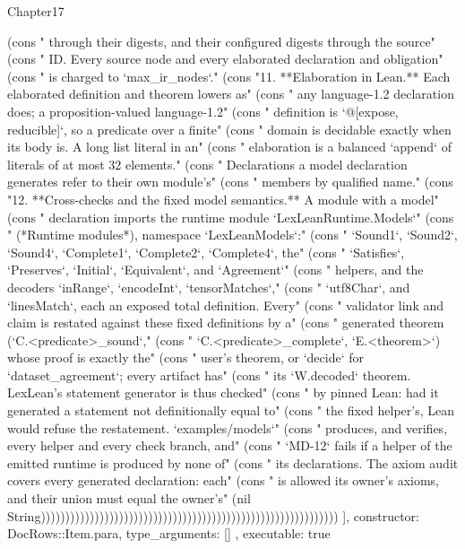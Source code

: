 \begin{lexlean}{Chapter17}
\begin{semanticmodule}
{{(cons "    through their digests, and their configured digests through the source" (cons "    ID. Every source node and every elaborated declaration and obligation" (cons "    is charged to `max_ir_nodes`." (cons "11. **Elaboration in Lean.** Each elaborated definition and theorem lowers as" (cons "    any language-1.2 declaration does; a proposition-valued language-1.2" (cons "    definition is `@[expose, reducible]`, so a predicate over a finite" (cons "    domain is decidable exactly when its body is. A long list literal in an" (cons "    elaboration is a balanced `append` of literals of at most 32 elements." (cons "    Declarations a model declaration generates refer to their own module's" (cons "    members by qualified name." (cons "12. **Cross-checks and the fixed model semantics.** A module with a model" (cons "    declaration imports the runtime module `LexLeanRuntime.Models`" (cons "    (*Runtime modules*), namespace `LexLeanModels`:" (cons "    `Sound1`, `Sound2`, `Sound4`, `Complete1`, `Complete2`, `Complete4`, the" (cons "    `Satisfies`, `Preserves`, `Initial`, `Equivalent`, and `Agreement`" (cons "    helpers, and the decoders `inRange`, `encodeInt`, `tensorMatches`," (cons "    `utf8Char`, and `linesMatch`, each an exposed total definition. Every" (cons "    validator link and claim is restated against these fixed definitions by a" (cons "    generated theorem (`C.<predicate>_sound`," (cons "    `C.<predicate>_complete`, `E.<theorem>`) whose proof is exactly the" (cons "    user's theorem, or `decide` for `dataset_agreement`; every artifact has" (cons "    its `W.decoded` theorem. LexLean's statement generator is thus checked" (cons "    by pinned Lean: had it generated a statement not definitionally equal to" (cons "    the fixed helper's, Lean would refuse the restatement. `examples/models`" (cons "    produces, and verifies, every helper and every check branch, and" (cons "    `MD-12` fails if a helper of the emitted runtime is produced by none of" (cons "    its declarations. The axiom audit covers every generated declaration: each" (cons "    is allowed its owner's axioms, and their union must equal the owner's" (nil String)))))))))))))))))))))))))))))))))))))))))))))))))))))))))))))
    ],
    constructor: DocRows::Item.para,
    type_arguments: []
  },
  executable: true
}


\end{semanticmodule}
\end{lexlean}
